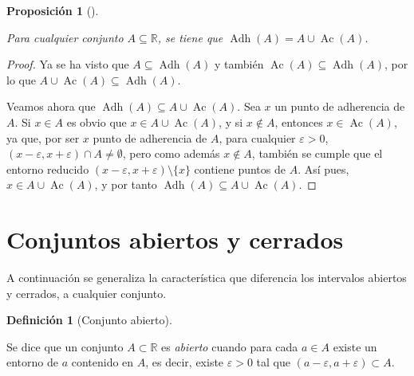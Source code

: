 \documentclass[
  a4paper,
]{scrreport}
\theoremstyle{definition}
\theoremstyle{plain}
\theoremstyle{definition}
\newtheorem{definition}{Definición}[chapter]
\theoremstyle{definition}
\theoremstyle{plain}
\theoremstyle{plain}
\newtheorem{proposition}{Proposición}[chapter]
\theoremstyle{remark}
\begin{document}
\begin{proposition}[]\protect\hypertarget{prp-adherencia-conjunto-mas-acumulacion}{}\label{prp-adherencia-conjunto-mas-acumulacion}

Para cualquier conjunto \(A\subseteq \mathbb{R}\), se tiene que
\(\operatorname{Adh}(A)=A\cup \operatorname{Ac}(A)\).

\end{proposition}

\begin{tcolorbox}[enhanced jigsaw, leftrule=.75mm, colbacktitle=quarto-callout-note-color!10!white, toprule=.15mm, opacityback=0, opacitybacktitle=0.6, toptitle=1mm, breakable, bottomtitle=1mm, colframe=quarto-callout-note-color-frame, rightrule=.15mm, titlerule=0mm, title=\textcolor{quarto-callout-note-color}{\faInfo}\hspace{0.5em}{Demostración}, arc=.35mm, left=2mm, bottomrule=.15mm, colback=white, coltitle=black]

\begin{proof}
Ya se ha visto que \(A\subseteq \operatorname{Adh}(A)\) y también
\(\operatorname{Ac}(A)\subseteq \operatorname{Adh}(A)\), por lo que
\(A\cup \operatorname{Ac}(A)\subseteq \operatorname{Adh}(A)\).

Veamos ahora que
\(\operatorname{Adh}(A)\subseteq A\cup \operatorname{Ac}(A)\). Sea \(x\)
un punto de adherencia de \(A\). Si \(x\in A\) es obvio que
\(x\in A\cup \operatorname{Ac}(A)\), y si \(x\not\in A\), entonces
\(x\in \operatorname{Ac}(A)\), ya que, por ser \(x\) punto de adherencia
de \(A\), para cualquier \(\varepsilon>0\),
\((x-\varepsilon,x+\varepsilon)\cap A\neq \emptyset\), pero como además
\(x\not\in A\), también se cumple que el entorno reducido
\((x-\varepsilon,x+\varepsilon)\setminus\{x\}\) contiene puntos de
\(A\). Así pues, \(x\in A\cup \operatorname{Ac}(A)\), y por tanto
\(\operatorname{Adh}(A)\subseteq A\cup \operatorname{Ac}(A)\).
\end{proof}

\end{tcolorbox}

\section{Conjuntos abiertos y
cerrados}\label{conjuntos-abiertos-y-cerrados}

A continuación se generaliza la característica que diferencia los
intervalos abiertos y cerrados, a cualquier conjunto.

\begin{definition}[Conjunto
abierto]\protect\hypertarget{def-conjunto-abierto}{}\label{def-conjunto-abierto}

Se dice que un conjunto \(A\subset \mathbb{R}\) es \emph{abierto} cuando
para cada \(a\in A\) existe un entorno de \(a\) contenido en \(A\), es
decir, existe \(\varepsilon>0\) tal que
\((a-\varepsilon, a+\varepsilon)\subset A\).

\end{definition}
\end{document}

